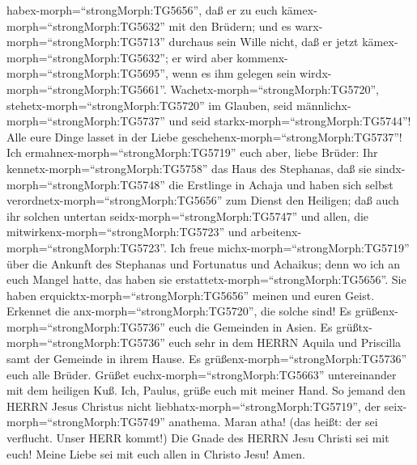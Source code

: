 habex-morph=``strongMorph:TG5656'', daß er zu euch
kämex-morph=``strongMorph:TG5632'' mit den Brüdern; und es
warx-morph=``strongMorph:TG5713'' durchaus sein Wille nicht, daß er
jetzt kämex-morph=``strongMorph:TG5632''; er wird aber
kommenx-morph=``strongMorph:TG5695'', wenn es ihm gelegen sein
wirdx-morph=``strongMorph:TG5661''. 
Wachetx-morph=``strongMorph:TG5720'',
stehetx-morph=``strongMorph:TG5720'' im Glauben, seid
männlichx-morph=``strongMorph:TG5737'' und seid
starkx-morph=``strongMorph:TG5744''!  Alle eure Dinge
lasset in der Liebe geschehenx-morph=``strongMorph:TG5737''!
 Ich ermahnex-morph=``strongMorph:TG5719'' euch aber, liebe
Brüder: Ihr kennetx-morph=``strongMorph:TG5758'' das Haus des Stephanas,
daß sie sindx-morph=``strongMorph:TG5748'' die Erstlinge in Achaja und
haben sich selbst verordnetx-morph=``strongMorph:TG5656'' zum Dienst den
Heiligen;  daß auch ihr solchen untertan
seidx-morph=``strongMorph:TG5747'' und allen, die
mitwirkenx-morph=``strongMorph:TG5723'' und
arbeitenx-morph=``strongMorph:TG5723''.  Ich freue
michx-morph=``strongMorph:TG5719'' über die Ankunft des Stephanas und
Fortunatus und Achaikus; denn wo ich an euch Mangel hatte, das haben sie
erstattetx-morph=``strongMorph:TG5656''.  Sie haben
erquicktx-morph=``strongMorph:TG5656'' meinen und euren Geist. Erkennet
die anx-morph=``strongMorph:TG5720'', die solche sind!  Es
grüßenx-morph=``strongMorph:TG5736'' euch die Gemeinden in Asien. Es
grüßtx-morph=``strongMorph:TG5736'' euch sehr in dem HERRN Aquila und
Priscilla samt der Gemeinde in ihrem Hause.  Es
grüßenx-morph=``strongMorph:TG5736'' euch alle Brüder. Grüßet
euchx-morph=``strongMorph:TG5663'' untereinander mit dem heiligen Kuß.
 Ich, Paulus, grüße euch mit meiner Hand.  So
jemand den HERRN Jesus Christus nicht
liebhatx-morph=``strongMorph:TG5719'', der
seix-morph=``strongMorph:TG5749'' anathema. Maran atha! (das heißt: der
sei verflucht. Unser HERR kommt!)  Die Gnade des HERRN Jesu
Christi sei mit euch!  Meine Liebe sei mit euch allen in
Christo Jesu! Amen.
